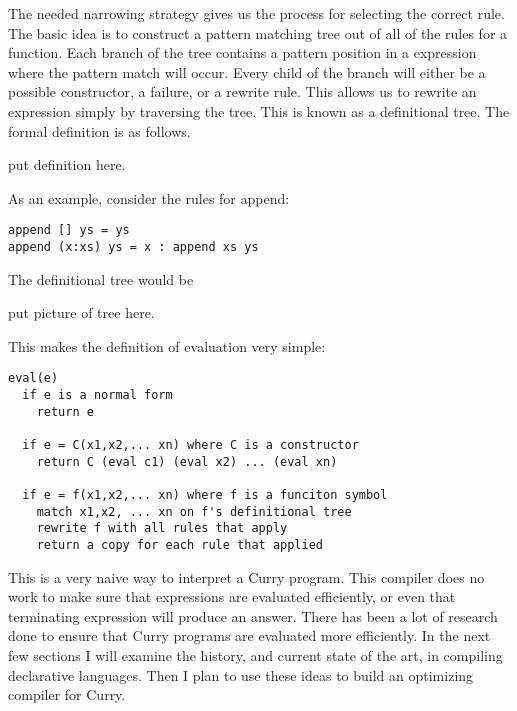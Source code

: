 The needed narrowing strategy gives us the process for selecting the correct rule.
The basic idea is to construct a pattern matching tree out of all of the rules for a function.
Each branch of the tree contains a pattern position in a expression where the pattern match will occur.
Every child of the branch will either be a possible constructor, a failure, or a rewrite rule.
This allows us to rewrite an expression simply by traversing the tree.
This is known as a definitional tree.
The formal definition is as follows.

put definition here.

As an example, consider the rules for append:
\begin{verbatim}
append [] ys = ys
append (x:xs) ys = x : append xs ys
\end{verbatim}

\noindent
The definitional tree would be 

put picture of tree here.

\noindent
This makes the definition of evaluation very simple:

\begin{verbatim}
eval(e)
  if e is a normal form
    return e

  if e = C(x1,x2,... xn) where C is a constructor
    return C (eval c1) (eval x2) ... (eval xn) 

  if e = f(x1,x2,... xn) where f is a funciton symbol
    match x1,x2, ... xn on f's definitional tree
    rewrite f with all rules that apply
    return a copy for each rule that applied
\end{verbatim}

This is a very naive way to interpret a Curry program.
This compiler does no work to make sure that expressions are evaluated efficiently,
or even that terminating expression will produce an answer.
There has been a lot of research done to ensure that Curry programs are evaluated more efficiently.
In the next few sections I will examine the history, and current state of the art, in compiling declarative languages.
Then I plan to use these ideas to build an optimizing compiler for Curry.
